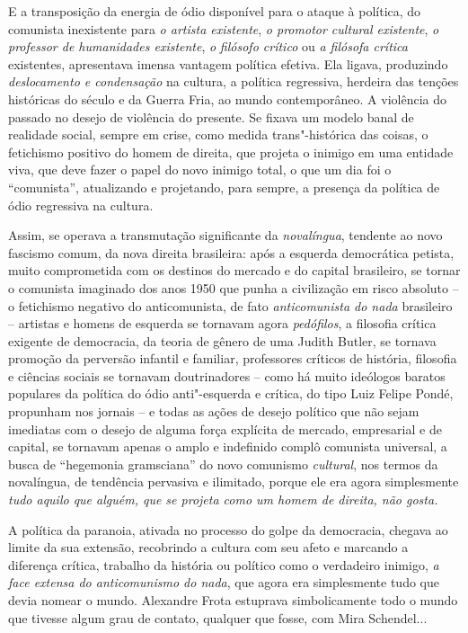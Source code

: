 E a transposição da energia de ódio disponível para o ataque à política,
do comunista inexistente para \emph{o artista existente}, \emph{o
promotor cultural existente}, \emph{o} \emph{professor de humanidades
existente}, \emph{o} \emph{filósofo crítico} ou \emph{a filósofa
crítica} existentes, apresentava imensa vantagem política efetiva. Ela
ligava, produzindo \emph{deslocamento e condensação} na cultura, a
política regressiva, herdeira das tenções históricas do século  e da
Guerra Fria, ao mundo contemporâneo. A violência do passado no desejo de
violência do presente. Se fixava um modelo banal de realidade social,
sempre em crise, como medida trans"-histórica das coisas, o fetichismo
positivo do homem de direita, que projeta o inimigo em uma entidade
viva, que deve fazer o papel do novo inimigo total, o que um dia foi o
``comunista'', atualizando e projetando, para sempre, a presença da
política de ódio regressiva na cultura.

Assim, se operava a transmutação significante da \emph{novalíngua},
tendente ao novo fascismo comum, da nova direita brasileira: após a
esquerda democrática petista, muito comprometida com os destinos do
mercado e do capital brasileiro, se tornar o comunista imaginado dos
anos 1950 que punha a civilização em risco absoluto -- o fetichismo
negativo do anticomunista, de fato \emph{anticomunista do nada}
brasileiro -- artistas e homens de esquerda se tornavam agora
\emph{pedófilos}, a filosofia crítica exigente de democracia, da teoria
de gênero de uma Judith Butler, se tornava promoção da perversão
infantil e familiar, professores críticos de história, filosofia e
ciências sociais se tornavam doutrinadores -- como há muito ideólogos
baratos populares da política do ódio anti"-esquerda e crítica, do tipo
Luiz Felipe Pondé, propunham nos jornais -- e todas as ações de desejo
político que não sejam imediatas com o desejo de alguma força explícita
de mercado, empresarial e de capital, se tornavam apenas o amplo e
indefinido complô comunista universal, a busca de ``hegemonia
gramsciana'' do novo comunismo \emph{cultural}, nos termos da
novalíngua, de tendência pervasiva e ilimitado, porque ele era agora
simplesmente \emph{tudo aquilo que alguém, que se projeta como um homem
de direita, não gosta. }

A política da paranoia, ativada no processo do golpe da democracia,
chegava ao limite da sua extensão, recobrindo a cultura com seu afeto e
marcando a diferença crítica, trabalho da história ou político como o
verdadeiro inimigo, \emph{a face extensa do anticomunismo do nada}, que
agora era simplesmente tudo que devia nomear o mundo. Alexandre Frota
estuprava simbolicamente todo o mundo que tivesse algum grau de contato,
qualquer que fosse, com Mira Schendel...

